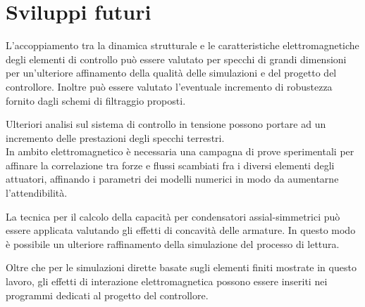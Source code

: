 \section{Sviluppi futuri}
L'accoppiamento tra la dinamica strutturale e le caratteristiche elettromagnetiche degli elementi di controllo può essere valutato per specchi di grandi dimensioni per un'ulteriore affinamento della qualità delle simulazioni e del progetto del controllore. Inoltre può essere valutato l'eventuale incremento di robustezza fornito dagli schemi di filtraggio proposti.

Ulteriori analisi sul sistema di controllo in tensione possono portare ad un incremento delle prestazioni degli specchi terrestri.\\ 

In ambito elettromagnetico è necessaria una campagna di prove sperimentali per affinare la correlazione tra forze e flussi scambiati fra i diversi elementi degli attuatori, affinando i parametri dei modelli numerici in modo da aumentarne l'attendibilità. 

La tecnica per il calcolo della capacità per condensatori assial-simmetrici può essere applicata  valutando gli effetti di concavità delle armature. In questo modo è possibile un ulteriore raffinamento della simulazione del processo di lettura.

Oltre che per le simulazioni dirette basate sugli elementi finiti mostrate in questo lavoro, gli effetti di interazione elettromagnetica possono essere inseriti nei programmi dedicati al progetto del controllore.